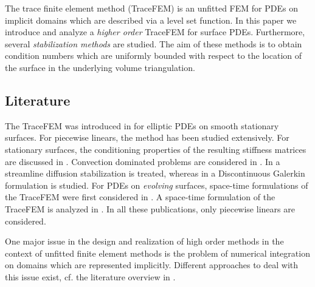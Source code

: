 \documentclass[final]{siamltex}
\begin{document}
The trace finite element method (TraceFEM) \cite{olshanskii2009finite} is an unfitted FEM for PDEs on implicit domains which are described via a level set function. 
In this paper we introduce and analyze a \emph{higher order} TraceFEM for surface PDEs. Furthermore, several \emph{stabilization methods} are studied. The aim of these methods is to obtain condition numbers which are uniformly bounded with respect to the location of the surface in the underlying volume triangulation. 

\subsection*{Literature}
The TraceFEM was introduced in \cite{olshanskii2009finite} for elliptic PDEs on smooth stationary surfaces. 
For piecewise linears, the method has been studied extensively. For stationary surfaces, the conditioning properties of the resulting stiffness matrices are discussed in \cite{reusken10matrixprop}. 
Convection dominated problems are considered in \cite{olshanskii14advection,burman15cutdgimajna}. In \cite{olshanskii14advection} a streamline diffusion stabilization is treated, whereas in \cite{burman15cutdgimajna} a Discontinuous Galerkin formulation is studied.
For PDEs on \emph{evolving} surfaces, space-time formulations of the TraceFEM were first considered in \cite{grande2014movingsurfaces}. A space-time formulation of the TraceFEM is analyzed in \cite{grande2014spacetime,olshanskii14spacetime,olshanskii14spacetimeanalysis} .
In all these publications, only piecewise linears are considered. 

One major issue in the design and realization of high order methods in the context of unfitted finite element methods is the problem of numerical integration on domains which are represented implicitly. Different approaches to deal with this issue exist, cf. the literature overview in \cite{lehrenfeld2015cmame}. 
\end{document}
